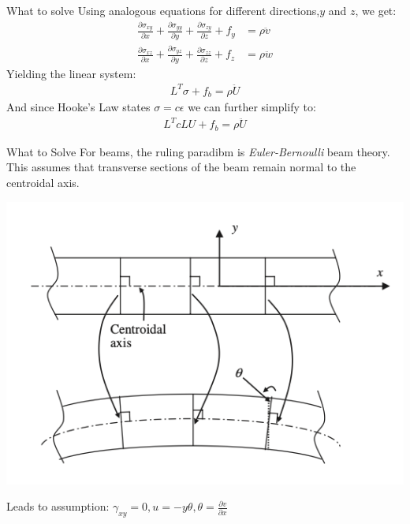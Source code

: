 \documentclass{beamer}
\begin{document}
\begin{frame}{What to solve}
    Using analogous equations for different directions,$y$ and $z$, we get:
    \begin{align*}
        \frac{\partial \sigma_{xy}}{\partial x} + \frac{\partial \sigma_{yy}}{\partial y} + \frac{\partial \sigma_{zy}}{\partial z} + f_y &= \rho \ddot{v} \\
        \frac{\partial \sigma_{xz}}{\partial x} + \frac{\partial \sigma_{yz}}{\partial y} + \frac{\partial \sigma_{zz}}{\partial z} + f_z &= \rho \ddot{w}
    \end{align*}
    Yielding the linear system:
    \begin{align}
        L^T\sigma + f_b = \rho \ddot{U}
    \end{align}
    And since Hooke's Law states $\sigma = c \epsilon$ we can further simplify to:
    \begin{align*}
        L^TcLU + f_b = \rho \ddot{U}
    \end{align*}
\end{frame}
\begin{frame}{What to Solve}
    For beams, the ruling paradibm is \textit{Euler-Bernoulli} beam theory. This assumes that transverse sections of the beam remain normal to the centroidal axis.
    \begin{center}
    \includegraphics[scale = 0.3]{EBbeam.png}
    \end{center}
    Leads to assumption: $\gamma_{xy} = 0, u = -y\theta, \theta = \frac{\partial v} {\partial x}$
\end{frame}
\end{document}
